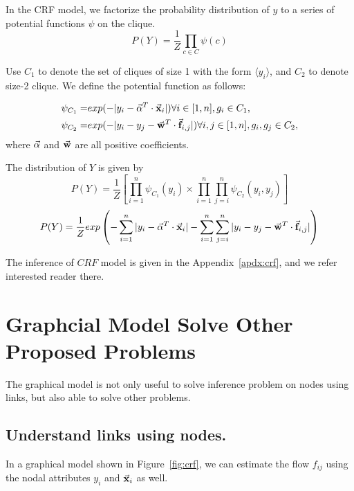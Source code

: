 In the CRF model, we factorize the probability distribution of $y$ to a series of potential functions $\psi$ on the clique. 
\begin{equation}
	P(Y) = \frac{1}{Z} \prod_{ c \in C} \psi(c)
\end{equation}

Use $C_1$ to denote the set of cliques of size 1 with the form $\langle y_i \rangle$, and $C_2$ to denote size-2 clique. We define the potential function as follows:

\begin{align}
	\psi_{C_1} = &exp( - |y_i - \vec{\mathbf{\alpha}}^T \cdot \vec{\mathbf{x}}_i| )  \forall i \in [1, n], {g_i} \in C_1, \\
	\psi_{C_2} = & exp( - |y_i - y_j - \vec{\mathbf{w}}^T \cdot \vec{\mathbf{f}}_{i,j}| )  \forall i,j \in [1, n], {g_i, g_j} \in C_2, 
\end{align}
where $\vec{\mathbf{\alpha}}$ and $\vec{\mathbf{w}}$ are all positive coefficients.

The distribution of $Y$ is given by 
\begin{equation}
	P(Y) =  \frac{1}{Z} \left[ \prod_{i=1}^n \psi_{C_1}(y_i) \times \prod_{i=1}^n \prod_{j=i}^n \psi_{C_2}(y_i, y_j) \right]
\end{equation}
\begin{equation}
	P(Y) =  \frac{1}{Z} exp  \left( - \sum_{i=1}^n |y_i - \vec{\mathbf{\alpha}}^T \cdot \vec{\mathbf{x}}_i|  - \sum_{i=1}^n\sum_{j=i}^n |y_i - y_j - \vec{\mathbf{w}}^T \cdot \vec{\mathbf{f}}_{i,j}| \right)
	\label{eq:PY}
\end{equation}


The inference of $CRF$ model is given in the Appendix~\ref{apdx:crf}, and we refer interested reader there.




\section{Graphcial Model Solve Other Proposed Problems}



The graphical model is not only useful to solve inference problem on nodes using links, but also able to solve other problems.



\subsection{Understand links using nodes.}

In a graphical model shown in Figure~\ref{fig:crf}, we can estimate the flow $f_{ij}$ using the nodal attributes $y_i$ and $\vec{\mathbf{x}}_i$ as well.


